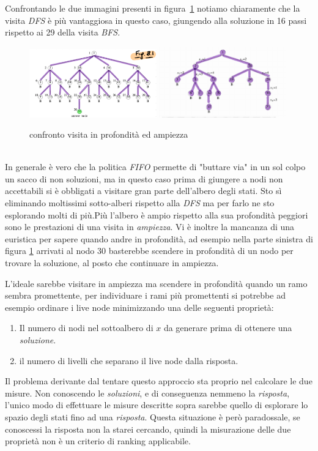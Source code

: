 \documentclass[a4paper]{article}
\begin{document}
\begin{adjustwidth}{.8cm}{0cm}
	Confrontando le due immagini presenti in figura~\ref{FIG:C_2_DFSvsBFS} notiamo chiaramente che la visita \textit{DFS} è più vantaggiosa in questo caso, giungendo alla soluzione in 16 passi rispetto ai 29 della visita \textit{BFS}.\\
\begin{figure}[!ht]
\centering
\includegraphics[width=0.49\textwidth]{./img/C_2_BFS.png}
\includegraphics[width=0.49\textwidth]{./img/C_2_DFS.png}
\caption{confronto visita in profondità ed ampiezza} \label{FIG:C_2_DFSvsBFS}
\end{figure}\\ 
In generale è vero che la politica \textit{FIFO} permette di "buttare via" in un sol colpo un sacco di non soluzioni, ma in questo caso prima di giungere a nodi non accettabili si è obbligati a visitare gran parte dell'albero degli stati.
Sto sì eliminando moltissimi sotto-alberi rispetto alla \textit{DFS} ma per farlo ne sto esplorando molti di più.Più l'albero è ampio rispetto alla sua profondità peggiori sono le prestazioni di una visita in \textit{ampiezza}.
Vi è inoltre la mancanza di una euristica per sapere quando andre in profondità, ad esempio nella parte sinistra di figura \ref{FIG:C_2_DFSvsBFS} arrivati al nodo 30 basterebbe scendere in profondità di un nodo per trovare la soluzione, al posto che continuare in ampiezza.


L'ideale sarebbe visitare in ampiezza ma scendere in profondità quando un ramo sembra promettente, per individuare i rami più promettenti si potrebbe ad esempio ordinare i live node minimizzando una delle seguenti proprietà:
\begin{enumerate}
	\item Il numero di nodi nel sottoalbero di $x$ da generare prima di ottenere una \emph{soluzione}.
	\item il numero di livelli che separano il live node dalla risposta.
\end{enumerate}
Il problema derivante dal tentare questo approccio sta proprio nel calcolare le due misure.
Non conoscendo le \textit{soluzioni}, e di conseguenza nemmeno la \textit{risposta}, l'unico modo di effettuare le misure descritte sopra sarebbe quello di esplorare lo spazio degli stati fino ad una \textit{risposta}.
Questa situazione è però paradossale, se conoscessi la risposta non la starei cercando, quindi la misurazione delle due proprietà non è un criterio di ranking applicabile.
\end{adjustwidth}
\end{document}

